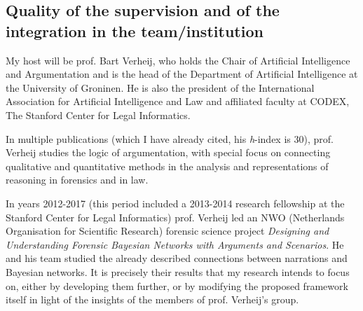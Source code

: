 \documentclass[11pt, a4paper]{article}
\begin{document}

\vspace{-5mm}

\subsection{Quality of the supervision and of the integration in the team/institution}

\vspace{-2mm}

My host will be prof. Bart Verheij, who holds the Chair of Artificial Intelligence and Argumentation and is the head of the Department of Artificial Intelligence at the University of Groninen. He is also the president of the International Association for Artificial Intelligence and Law and affiliated faculty at CODEX, The Stanford Center for Legal Informatics. 

In multiple publications (which I have already cited, his \emph{h}-index is 30), prof. Verheij studies the logic of argumentation, with special focus on connecting qualitative and quantitative methods in the analysis and representations of reasoning in forensics and in law. 

In years 2012-2017 (this period included a 2013-2014 research fellowship at the Stanford Center for Legal Informatics) prof. Verheij led an NWO (Netherlands Organisation for Scientific Research) forensic science project \emph{Designing and Understanding Forensic Bayesian Networks with Arguments and Scenarios}.  He and his team studied the already described connections between narrations and Bayesian networks.  It is precisely their results that my research intends to focus on, either by developing them further, or by modifying the proposed framework itself in light of the insights of the members of prof. Verheij's group.  
\end{document}
